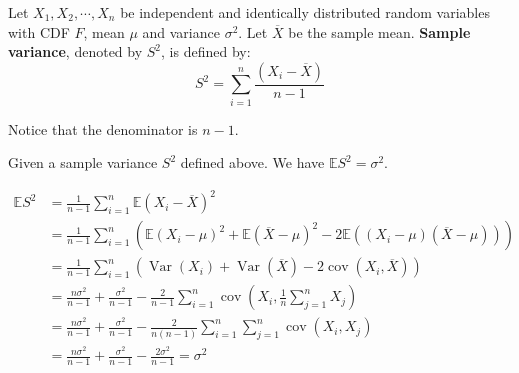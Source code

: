 \documentclass{huhtakm-template-book}
\newcommand{\expect}{\mathbb{E}}
\DeclareMathOperator{\Var}{Var}
\DeclareMathOperator{\cov}{cov}
\begin{document}
\begin{defn}
	Let $X_{1},X_{2},\cdots,X_{n}$ be independent and identically distributed random variables with CDF $F$, mean $\mu$ and variance $\sigma^{2}$. Let $\overline{X}$ be the sample mean. \textbf{Sample variance}, denoted by $S^{2}$, is defined by:
	\begin{equation*}
		S^{2}=\sum_{i=1}^{n}\frac{(X_{i}-\overline{X})}{n-1}
	\end{equation*}
\end{defn}
\begin{rem}
	Notice that the denominator is $n-1$.
\end{rem}
\begin{thm}
	Given a sample variance $S^{2}$ defined above. We have $\expect{S^{2}}=\sigma^{2}$.
\end{thm}
\begin{proofing}
	\begin{align*}
		\expect{S^{2}}&=\frac{1}{n-1}\sum_{i=1}^{n}\expect(X_{i}-\overline{X})^{2}\\
		&=\frac{1}{n-1}\sum_{i=1}^{n}(\expect(X_{i}-\mu)^{2}+\expect(\overline{X}-\mu)^{2}-2\expect((X_{i}-\mu)(\overline{X}-\mu)))\\
		&=\frac{1}{n-1}\sum_{i=1}^{n}(\Var(X_{i})+\Var(\overline{X})-2\cov(X_{i},\overline{X}))\\
		&=\frac{n\sigma^{2}}{n-1}+\frac{\sigma^{2}}{n-1}-\frac{2}{n-1}\sum_{i=1}^{n}\cov\left(X_{i},\frac{1}{n}\sum_{j=1}^{n}X_{j}\right)\\
		&=\frac{n\sigma^{2}}{n-1}+\frac{\sigma^{2}}{n-1}-\frac{2}{n(n-1)}\sum_{i=1}^{n}\sum_{j=1}^{n}\cov(X_{i},X_{j})\\
		&=\frac{n\sigma^{2}}{n-1}+\frac{\sigma^{2}}{n-1}-\frac{2\sigma^{2}}{n-1}=\sigma^{2}
	\end{align*}
\end{proofing}
\end{document}
